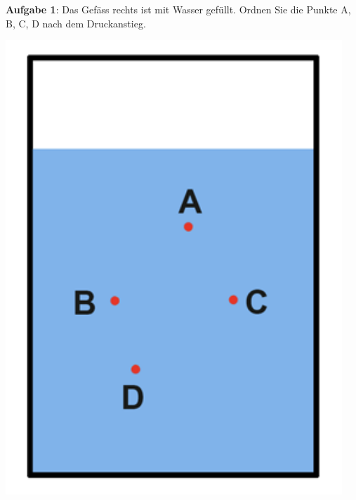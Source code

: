 \documentclass[11pt]{article}
\begin{document}
\begin{minipage}{0.75\textwidth}
    \textbf{Aufgabe 1}: Das Gefäss rechts ist mit Wasser gefüllt. Ordnen Sie die Punkte A, B, C, D nach dem Druckanstieg.\vspace{4cm}

\end{minipage}
\begin{minipage}{0.25\textwidth}
    \begin{flushright}
        \includegraphics[width=0.95\textwidth]{images/Auftrieb_A1.png}
    \end{flushright}
\end{minipage}
\end{document}
